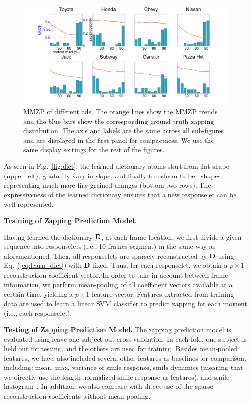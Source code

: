 \documentclass[10pt,journal,cspaper,compsoc]{IEEEtran}
\begin{document}
\begin{figure}[t]
	\centering
		\includegraphics[width=.8\textwidth]{fig/ad.png}
	\caption{MMZP of different ads. The orange lines show the MMZP trends and the blue bars show the corresponding ground truth zapping distribution\color[rgb]{0,0,0}. The axis and labels are the same across all sub-figures and are displayed in the first panel for compactness. We use the same display settings for the rest of the figures.}
	\label{fig:ad}
\end{figure}

As seen in Fig.~\ref{fig:dict}, the learned dictionary atoms start from flat shape (upper left), gradually vary in slope, and finally transform to bell shapes representing much more fine-grained changes (bottom two rows). The expressiveness of the learned dictionary ensures that a new responselet can be well represented. 


\noindent \textbf{Training of Zapping Prediction Model.} 

Having learned the dictionary ${\bf D}$, at each frame location, we first divide a given sequence into responselets (i.e., 10 frames segment) in the same way as aforementioned. Then, all responselets are sparsely reconstructed by ${\bf D}$ using Eq.~(\ref{eq:learn_dict}) with ${\bf D}$ fixed. Thus, for each responselet, we obtain a $p\times 1$ reconstruction coefficient vector. In order to take in account between frame information, we perform mean-pooling of all coefficient vectors available at a certain time, yielding a $p\times 1$ feature vector. Features extracted from training data are used to learn a linear SVM classifier to predict zapping for each moment (i.e., each responselet).

\noindent \textbf{Testing of Zapping Prediction Model.} The zapping prediction model is evaluated using leave-one-subject-out cross validation. In each fold, one subject is held out for testing, and the others are used for training. Besides mean-pooled features, we have also included several other features as baselines for comparison,  including: mean, max, variance of smile response, smile dynamics (meaning that we directly use the length-normalized smile response as features), and smile histogram~\cite{Yang_TAC14}. In addition, we also compare with direct use of the sparse reconstruction coefficients without mean-pooling.
\end{document}
